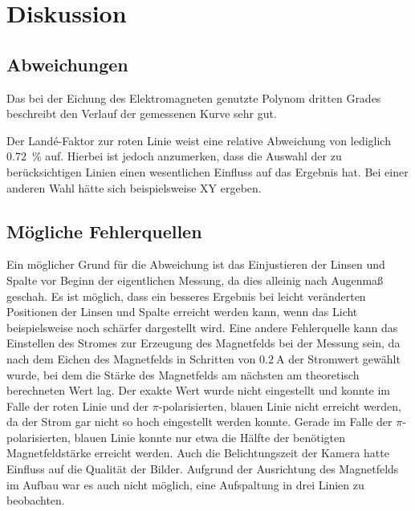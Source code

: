 \section{Diskussion}
\label{sec:diskussion}

\subsection{Abweichungen}

Das bei der Eichung des Elektromagneten genutzte Polynom dritten Grades
beschreibt den Verlauf der gemessenen Kurve sehr gut.

Der Landé-Faktor zur roten Linie weist eine relative Abweichung von lediglich \SI{0.72}{\percent} auf.
Hierbei ist jedoch anzumerken, dass die Auswahl der zu berücksichtigen Linien einen wesentlichen Einfluss
auf das Ergebnis hat.
Bei einer anderen Wahl hätte sich beispielsweise XY ergeben.


\subsection{Mögliche Fehlerquellen}

    Ein möglicher Grund für die Abweichung ist das Einjustieren der Linsen und Spalte vor Beginn der eigentlichen Messung,
    da dies alleinig nach Augenmaß geschah.
    Es ist möglich,
    dass ein besseres Ergebnis bei leicht veränderten Positionen der Linsen und Spalte erreicht werden kann,
    wenn das Licht beispielsweise noch schärfer dargestellt wird.
    Eine andere Fehlerquelle kann das Einstellen des Stromes zur Erzeugung des Magnetfelds bei der Messung sein,
    da nach dem Eichen des Magnetfelds in Schritten von $\SI{0.2}{\ampere}$ der Stromwert gewählt wurde,
    bei dem die Stärke des Magnetfelds am nächsten am theoretisch berechneten Wert lag.
    Der exakte Wert wurde nicht eingestellt
    und konnte im Falle der roten Linie und der $\pi$-polarisierten, blauen Linie nicht erreicht werden,
    da der Strom gar nicht so hoch eingestellt werden konnte.
    Gerade im Falle der $\pi$-polarisierten, blauen Linie konnte nur etwa die Hälfte der benötigten Magnetfeldstärke erreicht werden.
    Auch die Belichtungszeit der Kamera hatte Einfluss auf die Qualität der Bilder.
    Aufgrund der Ausrichtung des Magnetfelds im Aufbau war es auch nicht möglich,
    eine Aufspaltung in drei Linien zu beobachten.
